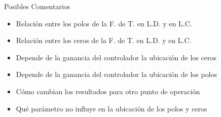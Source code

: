 Posibles Comentarios
\begin{itemize}
    \item Relación entre los polos de la F. de T. en L.D. y en L.C.
    \item Relación entre los ceros de la F. de T. en L.D. y en L.C.
    \item Depende de la ganancia del controlador la ubicación de los ceros
    \item Depende de la ganancia del controlador la ubicación de los polos
    \item Cómo cambian los resultados para otro punto de operación
    \item Qué parámetro no influye en la ubicación de los polos y ceros
\end{itemize}